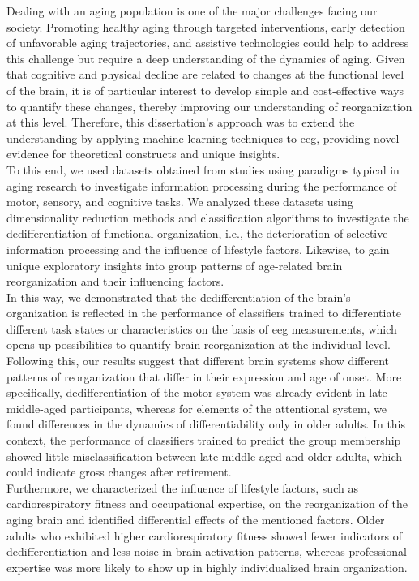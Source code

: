 Dealing with an aging population is one of the major challenges facing our society. Promoting healthy aging through targeted interventions, early detection of unfavorable aging trajectories, and assistive technologies could help to address this challenge but require a deep understanding of the dynamics of aging. Given that cognitive and physical decline are related to changes at the functional level of the brain, it is of particular interest to develop simple and cost-effective ways to quantify these changes, thereby improving our understanding of reorganization at this level. Therefore, this dissertation's approach was to extend the understanding by applying machine learning techniques to \gls{eeg}, providing novel evidence for theoretical constructs and unique insights.\\
To this end, we used datasets obtained from studies using paradigms typical in aging research to investigate information processing during the performance of motor, sensory, and cognitive tasks. We analyzed these datasets using dimensionality reduction methods and classification algorithms to investigate the dedifferentiation of functional organization, i.e., the deterioration of selective information processing and the influence of lifestyle factors. Likewise, to gain unique exploratory insights into group patterns of age-related brain reorganization and their influencing factors.\\
In this way, we demonstrated that the dedifferentiation of the brain's organization is reflected in the performance of classifiers trained to differentiate different task states or characteristics on the basis of \gls{eeg} measurements, which opens up possibilities to quantify brain reorganization at the individual level. Following this, our results suggest that different brain systems show different patterns of reorganization that differ in their expression and age of onset. More specifically, dedifferentiation of the motor system was already evident in late middle-aged participants, whereas for elements of the attentional system, we found differences in the dynamics of differentiability only in older adults. In this context, the performance of classifiers trained to predict the group membership showed little misclassification between late middle-aged and older adults, which could indicate gross changes after retirement.\\
Furthermore, we characterized the influence of lifestyle factors, such as cardiorespiratory fitness and occupational expertise, on the reorganization of the aging brain and identified differential effects of the mentioned factors. Older adults who exhibited higher cardiorespiratory fitness showed fewer indicators of dedifferentiation and less noise in brain activation patterns, whereas professional expertise was more likely to show up in highly individualized brain organization.\\
